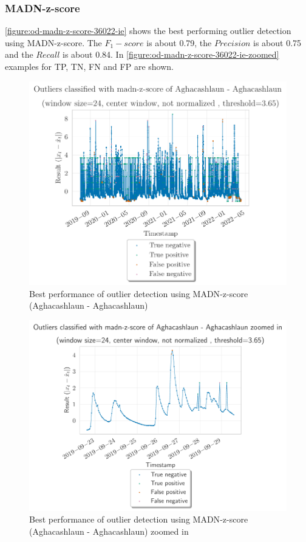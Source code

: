 \subsubsection{MADN-z-score}
\autoref{figure:od-madn-z-score-36022-ie} shows the best performing outlier detection using \ac{MADN}-z-score. The $F_1-score$ is about 0.79, the $Precision$ is about 0.75 and the $Recall$ is about 0.84. In \autoref{figure:od-madn-z-score-36022-ie-zoomed} examples for \ac{TP}, \ac{TN}, \ac{FN} and \ac{FP} are shown.
\begin{figure}[H]
    \centering 
    \includegraphics{plots/pdfs/36022-ie/od_madn-z-score_36022-ie_all.pdf}
    \caption{Best performance of outlier detection using \ac{MADN}-z-score (Aghacashlaun - Aghacashlaun)}
    \label{figure:od-madn-z-score-36022-ie}
\end{figure}
\begin{figure}[H]
    \centering 
    \includegraphics{plots/pdfs/36022-ie/od_madn-z-score_36022-ie_zoomed.pdf}
    \caption{Best performance of outlier detection using \ac{MADN}-z-score (Aghacashlaun - Aghacashlaun) zoomed in}
    \label{figure:od-madn-z-score-36022-ie-zoomed}
\end{figure}
\clearpage
